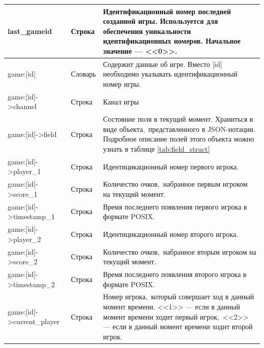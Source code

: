 \documentclass[14pt,a4paper]{report}
\begin{document}
\begin{longtable}{| l | p{3.5cm} | p{6cm} |}
last\_gameid & Строка & Идентификационный номер последней созданной игры. Используется для обеспечения уникальности идентификационных номеров. Начальное значение --- <<0>>.\\*\hline
game:[id] & Словарь & Содержит данные об игре. Вместо [id] необходимо указывать идентификационный номер игры.\\*\hline
game:[id]->channel & Строка & Канал игры \\*\hline
game:[id]->field & Строка & Состояние поля в текущий момент. Храниться в виде объекта,~представленного в JSON-нотации. Подробное описание полей этого объекта можно узнать в таблице \ref{tab:field_struct} \\*\hline
game:[id]->player\_1 & Строка & Идентицикационный номер первого игрока.\\*\hline
game:[id]->score\_1 & Строка & Количество очков,~набранное первым игроком на текущий момент.\\*\hline
game:[id]->timestamp\_1 & Строка & Время последнего появления первого игрока в формате POSIX.\\*\hline
game:[id]->player\_2 & Строка & Идентицикационный номер второго игрока.\\*\hline
game:[id]->score\_2 & Строка & Количество очков,~набранное вторым игроком на текущий момент.\\*\hline
game:[id]->timestamp\_2 & Строка & Время последнего появления второго игрока в формате POSIX.\\*\hline
game:[id]->current\_player & Строка & Номер игрока,~который совершает ход в данный момент времени. <<1>> --- если в данный момент времени ходит первый игрок,~<<2>> --- если в данный момент времени ходит второй игрок.\\*\hline
\end{longtable}
\end{document}
